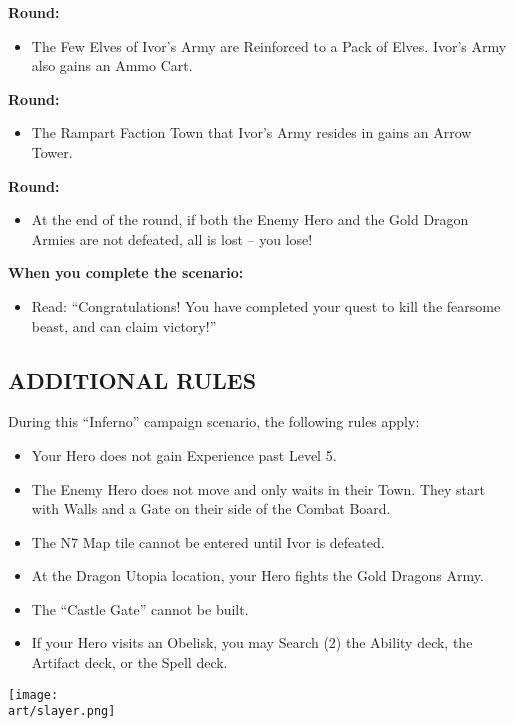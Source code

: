 \begin{multicols*}{2}
\textbf{ Round:}
\begin{itemize}
  \item The Few Elves of Ivor's Army are Reinforced to a Pack of Elves.
    Ivor's Army also gains an Ammo Cart.
\end{itemize}

\textbf{ Round:}
\begin{itemize}
  \item The Rampart Faction Town that Ivor's Army resides in gains an Arrow Tower.
\end{itemize}

\textbf{ Round:}
\begin{itemize}
  \item At the end of the round, if both the Enemy Hero and the Gold Dragon Armies are not defeated, all is lost -- you lose!
\end{itemize}

\textbf{When you complete the scenario:}
\begin{itemize}
  \item Read: ``Congratulations! You have completed your quest to kill the fearsome beast, and can claim victory!''
\end{itemize}


\subsection*{\MakeUppercase{Additional rules}}

During this ``Inferno'' campaign scenario, the following rules apply:

\begin{itemize}
    \item Your Hero does not gain Experience past Level 5.
    \item The Enemy Hero does not move and only waits in their Town. They start with Walls and a Gate on their side of the Combat Board.
    \item The N7 Map tile cannot be entered until Ivor is defeated.
    \item At the Dragon Utopia location, your Hero fights the Gold Dragons Army.
    \item The ``Castle Gate'' cannot be built.
    \item If your Hero visits an Obelisk, you may Search (2) the Ability deck, the Artifact deck, or the Spell deck.
\end{itemize}

\vspace*{\fill}
\texttt{[image: \\art/slayer.png]}
\vspace*{\fill}

\end{multicols*}

